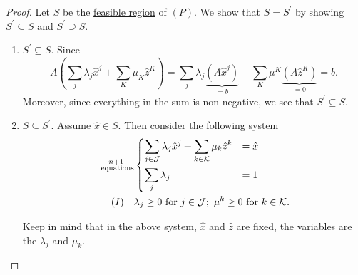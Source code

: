 \begin{proof}
	Let \(S\) be the \hyperref[def:feasible-region]{feasible region} of \((P)\). We show that \(S = S^\prime\) by showing \(S^\prime\subseteq S\) and \(S^\prime\supseteq S\).
	\begin{enumerate}
		\item \(S^\prime\subseteq S\). Since
		      \[
			      A\left(\sum\limits_{j}\lambda_{j}\hat{x}^j + \sum\limits_{K}\mu_K \hat{z}^K \right)= \sum\limits_j \lambda_{j}\underbrace{\left(A \hat{x}^j\right)}_{=b}+\sum\limits_{K} \mu^K \underbrace{\left(A \hat{z}^K\right)}_{=0} = b.
		      \]
		      Moreover, since everything in the sum is non-negative, we see that \(S^\prime\subseteq S\).
		\item \(S\subseteq S^\prime\). Assume \(\hat{x}\in S\). Then consider the following system
		      \[
			      \begin{split}
				      \substack{n+1\\ \text{ equations}}&\begin{dcases}
					      \sum\limits_{j\in\mathcal{J}} \lambda_{j}\hat{x}^j + \sum\limits_{k\in\mathcal{K} } \mu_k \hat{z}^k & = \hat{x} \\
					      \sum\limits_{j}\lambda_{j}                                                                          & = 1       \\
				      \end{dcases}\\
				      (I)\quad&\lambda_{j}\geq 0 \text{ for }j\in\mathcal{J};\ \mu^k\geq 0 \text{ for }k\in\mathcal{K}.
			      \end{split}
		      \]
		      \begin{note}
			      Keep in mind that in the above system, \(\hat{x}\) and \(\hat{z}\) are fixed, the variables are the \(\lambda_{j}\) and \(\mu_k\).
		      \end{note}


\end{enumerate}
\end{proof}
